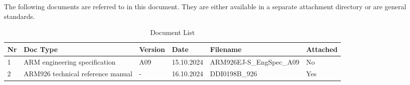 The following documents are referred to in this document. They are either available in a separate attachment directory or are general standards.
\begin{table}[H]
\caption{Document List}
\label{tab:docover03}
\centering
\begin{tabularx}{\textwidth}{|l |X |l |l |X |l |}
  \hline
  Nr & Doc Type & Version & Date & Filename & Attached \\
  \hline
  \hline
  1 & ARM engineering specification & A09 & 15.10.2024 & ARM926EJ-S\_EngSpec\_A09 & No \\
  \hline
  2 & ARM926 technical reference manual & - & 16.10.2024 & DDI0198B\_926  & Yes \\
  \hline
\end{tabularx}
\end{table}
